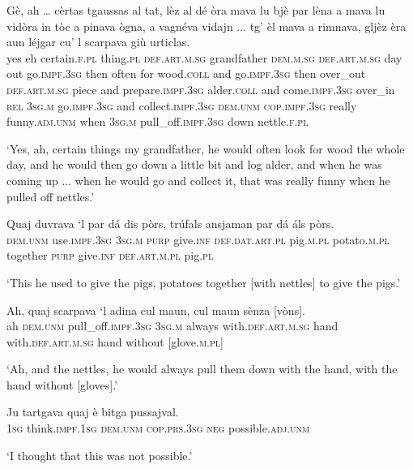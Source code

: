 \begin{linenumbers}
\gll  Gè, ah … cèrtas tgaussas al tat, lèz al dé òra mava lu bjè par lèna a mava lu vidòra in tòc a pinava ògna, a vagnéva vidajn ... tg’ èl mava a rimnava, gljèz èra aun léjgar cu’ l scarpava giù urticlas.  \\
yes eh {} certain.\textsc{f.pl} thing.\textsc{pl} \textsc{def.art.m.sg} grandfather \textsc{dem.m.sg}  \textsc{def.art.m.sg} day out go.\textsc{impf.3sg} then often for wood.\textsc{coll} and go.\textsc{impf.3sg} then over\_out \textsc{def.art.m.sg} piece and prepare.\textsc{impf.3sg} alder.\textsc{coll} and come.\textsc{impf.3sg} over\_in {} \textsc{rel} \textsc{3sg.m} go.\textsc{impf.3sg} and collect.\textsc{impf.3sg} \textsc{dem.unm} \textsc{cop.impf.3sg} really funny.\textsc{adj.unm} when \textsc{3sg.m} pull\_off.\textsc{impf.3sg} down nettle.\textsc{f.pl} \\
\end{linenumbers}
\medskip
\glt `Yes, ah, certain things my grandfather, he would often look for wood the whole day, and he would then go down a little bit and log alder, and when he was coming up ... when he would go and collect it, that was really funny when he pulled off nettles.'
\medskip

\begin{linenumbers}
\gll   Quaj duvrava `l par dá dis pòrs, trúfals ansjaman par dá áls pòrs. \\
 \textsc{dem.unm} use.\textsc{impf.3sg} \textsc{3sg.m} \textsc{purp} give.\textsc{inf} \textsc{def.dat.art.pl} pig.\textsc{m.pl} potato.\textsc{m.pl} together \textsc{purp} give.\textsc{inf} \textsc{def.art.m.pl} pig.\textsc{pl}\\
\end{linenumbers}
\medskip
\glt `This he used to give the pigs, potatoes together [with nettles] to give the pigs.'
\medskip

\begin{linenumbers}
\gll  Ah, quaj scarpava `l adina cul maun, cul maun sènza [vòns].  \\
ah  \textsc{dem.unm} pull\_off.\textsc{impf.3sg} \textsc{3sg.m} always with.\textsc{def.art.m.sg} hand with.\textsc{def.art.m.sg} hand without [glove.\textsc{m.pl}]  \\
\end{linenumbers}
\medskip
\glt `Ah, and the nettles, he would always pull them down with the hand, with the hand without [gloves].'
\medskip

\begin{linenumbers}
\gll  Ju tartgava quaj è bitga pussajval.  \\
 \textsc{1sg} think.\textsc{impf.1sg} \textsc{dem.unm} \textsc{cop.prs.3sg} \textsc{neg} possible.\textsc{adj.unm}  \\ 
\end{linenumbers} 
\medskip
\glt `I thought that this was not possible.'
\medskip

